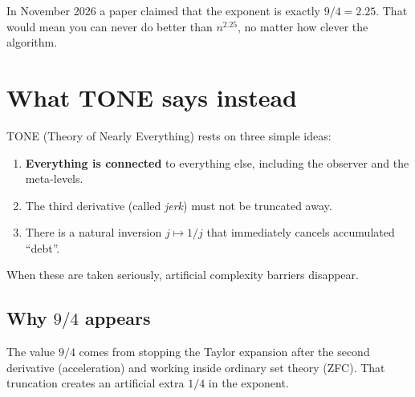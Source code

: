 \documentclass[11pt,a4paper]{article}
\begin{document}
In November 2026 a paper claimed that the exponent is exactly \(9/4 = 2.25\).  
That would mean you can never do better than \(n^{2.25}\), no matter how clever the algorithm.

\begin{center}
\end{center}

\section{What TONE says instead}

TONE (Theory of Nearly Everything) rests on three simple ideas:

\begin{enumerate}
  \item \textbf{Everything is connected} to everything else, including the observer and the meta-levels.
  \item The third derivative (called \emph{jerk}) must not be truncated away.
  \item There is a natural inversion \(j \mapsto 1/j\) that immediately cancels accumulated ``debt''.
\end{enumerate}

When these are taken seriously, artificial complexity barriers disappear.

\subsection{Why \(9/4\) appears}

The value \(9/4\) comes from stopping the Taylor expansion after the second derivative (acceleration) and working inside ordinary set theory (ZFC).  
That truncation creates an artificial extra \(1/4\) in the exponent.

\begin{center}
\end{center}
\end{document}
